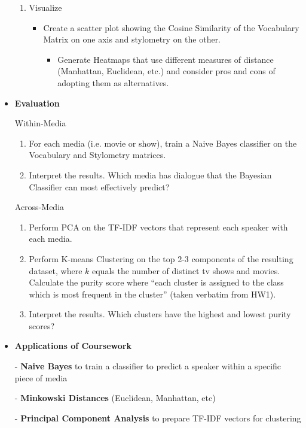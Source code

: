 \documentclass{article}
\begin{document}
\begin{titlepage}
\begin{itemize}
\begin{enumerate}
			\item Visualize
			\begin{itemize}
				\item Create a scatter plot showing the Cosine Similarity of the Vocabulary Matrix on one axis and stylometry on the other.
				\begin{itemize}
					\item Generate Heatmaps that use different measures of distance (Manhattan, Euclidean, etc.) and consider pros and cons of adopting them as alternatives.
				\end{itemize}
			\end{itemize}
		\end{enumerate}
	
		\item[] \textbf{Evaluation}

		Within-Media

		\begin{enumerate}
			\item For each media (i.e. movie or show), train a Naive Bayes classifier on the Vocabulary and Stylometry matrices.
			\item Interpret the results. Which media has dialogue that the Bayesian Classifier can most effectively predict?
		\end{enumerate}

		Across-Media

		\begin{enumerate}
			\item Perform PCA on the TF-IDF vectors that represent each speaker with each media.
			\item Perform K-means Clustering on the top 2-3 components of the resulting dataset, where $k$ equals the number of distinct tv shows and movies. Calculate the purity score where ``each cluster is assigned to the class which is most frequent in the cluster'' (taken verbatim from HW1).
			\item Interpret the results. Which clusters have the highest and lowest purity scores?
		\end{enumerate}
		

\item[] \textbf{Applications of Coursework}

- \textbf{Naive Bayes} to train a classifier to predict a speaker within a specific piece of media

- \textbf{Minkowski Distances} (Euclidean, Manhattan, etc)

- \textbf{Principal Component Analysis} to prepare TF-IDF vectors for clustering


\end{itemize}
\end{titlepage}
\end{document}
